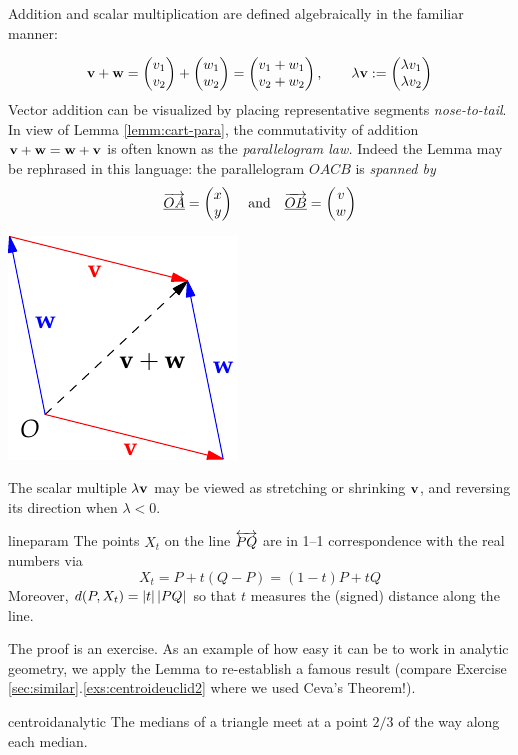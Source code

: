 Addition and scalar multiplication are defined algebraically in the familiar manner:\par
\begin{minipage}[t]{0.74\linewidth}\vspace{-5pt}
\[{\mathbf{v}}+{\mathbf{w}}=\begin{pmatrix}v_1\\v_2\end{pmatrix}+\begin{pmatrix}w_1\\w_2\end{pmatrix}=\begin{pmatrix}v_1+w_1\\v_2+w_2\end{pmatrix},\qquad \lambda{\mathbf{v}}:=\begin{pmatrix}\lambda v_1\\\lambda v_2\end{pmatrix}\]
Vector addition can be visualized by placing representative segments \emph{nose-to-tail}. In view of Lemma \ref{lemm:cart-para}, the commutativity of addition ${\mathbf{v}}+{\mathbf{w}}={\mathbf{w}}+{\mathbf{v}}$ is often known as the \emph{parallelogram law.} Indeed the Lemma may be rephrased in this language: the parallelogram $OACB$ is \emph{spanned by}
\[\overrightarrow{\underline{OA}}=\begin{pmatrix}x\\y\end{pmatrix}\quad\text{and}\quad\overrightarrow{\underline{OB}}=\begin{pmatrix}v\\w\end{pmatrix}\]
\end{minipage}
\begin{minipage}[t]{0.25\linewidth}\vspace{0pt}
\flushright\includegraphics{analytic-para2}
\end{minipage}\medbreak
The scalar multiple $\lambda{\mathbf{v}}$ may be viewed as stretching or shrinking ${\mathbf{v}}$, and reversing its direction when $\lambda<0$.

\goodbreak

\fi


\begin{lemm}{}{lineparam}
	The points $X_t$ on the line $\overleftrightarrow{PQ}$ are in 1--1 correspondence with the real numbers via 
	\[
		X_t= P+t(Q-P)=(1-t)P+tQ
	\]
	Moreover, $d(P,X_t)=\left| t\right|\left| PQ\right|$ so that $t$ measures the (signed) distance along the line.
\end{lemm}

The proof is an exercise. As an example of how easy it can be to work in analytic geometry, we apply the Lemma to re-establish a famous result (compare Exercise \ref*{sec:similar}.\ref{exs:centroideuclid2} where we used Ceva's Theorem!).

\begin{thm}{}{centroidanalytic}
	The medians of a triangle meet at a point $2/3$ of the way along each median.
\end{thm}


